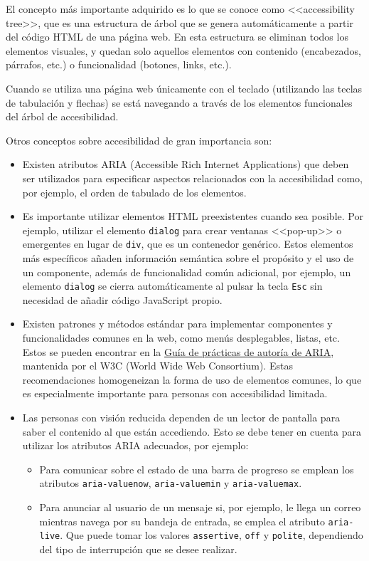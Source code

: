 El concepto más importante adquirido es lo que se conoce como <<accessibility
tree>>, que es una estructura de árbol que se genera automáticamente a partir
del código HTML de una página web. En esta estructura se eliminan todos los
elementos visuales, y quedan solo aquellos elementos con contenido (encabezados,
párrafos, etc.) o funcionalidad (botones, links, etc.).

Cuando se utiliza una página web únicamente con el teclado (utilizando las
teclas de tabulación y flechas) se está navegando a través de los elementos
funcionales del árbol de accesibilidad.

Otros conceptos sobre accesibilidad de gran importancia son:

\begin{itemize}
    \item Existen atributos ARIA (Accessible Rich Internet Applications) que
    deben ser utilizados para especificar aspectos relacionados con la
    accesibilidad como, por ejemplo, el orden de tabulado de los elementos.
    \item Es importante utilizar elementos HTML preexistentes cuando sea
    posible. Por ejemplo, utilizar el elemento \texttt{dialog} para crear
    ventanas <<pop-up>> o emergentes en lugar de \texttt{div}, que es un
    contenedor genérico. Estos elementos más específicos añaden información
    semántica sobre el propósito y el uso de un componente, además de
    funcionalidad común adicional, por ejemplo, un elemento \texttt{dialog} se
    cierra automáticamente al pulsar la tecla \texttt{Esc} sin necesidad de
    añadir código JavaScript propio.
    \item Existen patrones y métodos estándar para implementar componentes y
    funcionalidades comunes en la web, como menús desplegables, listas, etc.
    Estos se pueden encontrar en la
    \href{https://www.w3.org/WAI/ARIA/apg/patterns/}{Guía de prácticas de
    autoría de ARIA}, mantenida por el W3C (World Wide Web Consortium). Estas
    recomendaciones homogeneizan la forma de uso de elementos comunes, lo que es
    especialmente importante para personas con accesibilidad limitada.
    \item Las personas con visión reducida dependen de un lector de pantalla
    para saber el contenido al que están accediendo. Esto se debe tener en
    cuenta para utilizar los atributos ARIA adecuados, por ejemplo:
        \begin{itemize}
            \item Para comunicar sobre el estado de una barra de progreso se
            emplean los atributos \texttt{aria-valuenow}, \texttt{aria-valuemin}
            y \texttt{aria-valuemax}.
            \item Para anunciar al usuario de un mensaje si, por ejemplo, le
            llega un correo mientras navega por su bandeja de entrada, se emplea
            el atributo \texttt{aria-live}. Que puede tomar los valores
            \texttt{assertive}, \texttt{off} y \texttt{polite}, dependiendo del
            tipo de interrupción que se desee realizar.
        \end{itemize}
\end{itemize}

